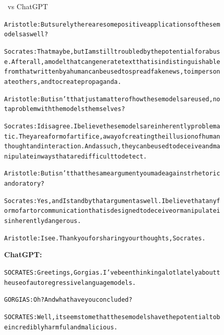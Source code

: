 \begin{figure}
\begin{AIbox}{\DV \ vs ChatGPT}
{\begin{alltt}
    Aristotle: But surely there are some positive applications of these models as well? \\\vspace{-2px}
    
    Socrates: That may be, but I am still troubled by the potential for abuse. After all, a model that can generate text that is indistinguishable from that written by a human can be used to spread fake news, to impersonate others, and to create propaganda. \\\vspace{-2px}
    
    Aristotle: But isn't that just a matter of how these models are used, not a problem with the models themselves? \\\vspace{-2px}
    
    Socrates: I disagree. I believe these models are inherently problematic. They are a form of artifice, a way of creating the illusion of human thought and interaction. And as such, they can be used to deceive and manipulate in ways that are difficult to detect. \\\vspace{-2px}
    
    Aristotle: But isn't that the same argument you made against rhetoric and oratory? \\\vspace{-2px}
    
    Socrates: Yes, and I stand by that argument as well. I believe that any form of art or communication that is designed to deceive or manipulate is inherently dangerous. \\\vspace{-2px}
    
    Aristotle: I see. Thank you for sharing your thoughts, Socrates.
    \end{alltt}}\hfill
    \parbox[t]{0.53\linewidth}{{\bf ChatGPT:} \scriptsize \begin{alltt}
    SOCRATES: Greetings, Gorgias. I've been thinking a lot lately about the use of autoregressive language models. \\\vspace{-2px}
    
    GORGIAS: Oh? And what have you concluded? \\\vspace{-2px}
    
    SOCRATES: Well, it seems to me that these models have the potential to be incredibly harmful and malicious. \\\vspace{-2px}
    

\end{alltt}}
\end{AIbox}
\end{figure}
